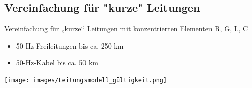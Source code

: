 \subsection{Vereinfachung für "kurze" Leitungen}

Vereinfachung für „kurze“ Leitungen mit konzentrierten Elementen R, G, L, C
\begin{itemize}
    \item 50-Hz-Freileitungen bis ca. 250 km
    \item 50-Hz-Kabel bis ca. 50 km
\end{itemize}

\vspace{0.15cm}

\texttt{[image: images/Leitungsmodell\_gültigkeit.png]}

\vspace{0.15cm}




























